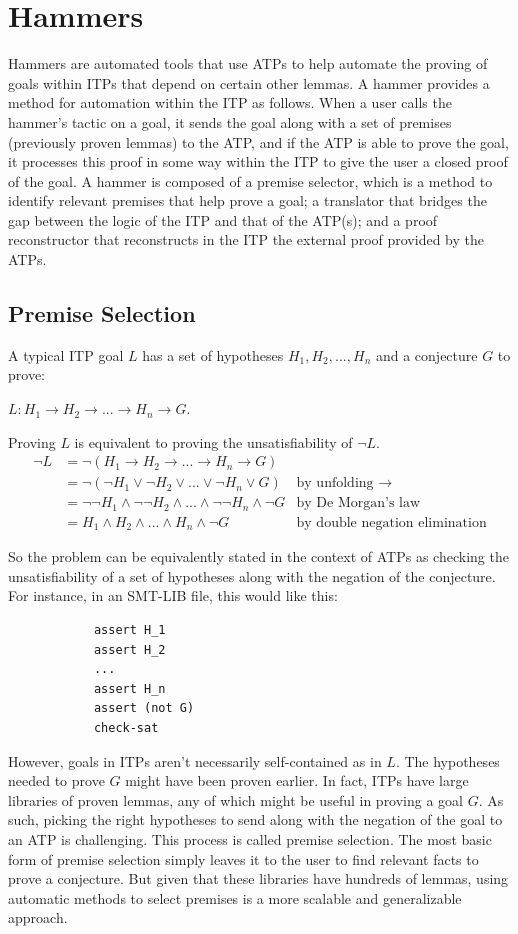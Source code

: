 \documentclass{article}
\begin{document}
\section{Hammers}
\label{sec:hammer}
	Hammers are automated tools that use ATPs to 
	help automate the proving of goals within ITPs
	that depend on certain other lemmas. A hammer 
	provides a method for automation within the 
	ITP as follows. When a user calls the hammer's 
	tactic on a goal, it sends the goal 
	along with a set of premises (previously proven 
	lemmas) to the ATP, and if the ATP is able to 
	prove the goal, it processes this proof in some 
	way within the ITP to give the user a closed 
	proof of the goal. A hammer is composed of 
	a premise selector, which is a method to identify 
	relevant premises that help prove a goal; a 
	translator that bridges the gap between the logic 
	of the ITP and that of the ATP(s); 
	and a proof reconstructor that reconstructs in the 
	ITP the external proof provided by the ATPs.
	
	\subsection{Premise Selection}
		A typical ITP goal $L$ has a set of hypotheses 
		$H_1, H_2, ..., H_n$ and a conjecture $G$ to 
		prove:
		\begin{center}
			$L : H_1 \to H_2 \to ... \to H_n \to G$.
		\end{center}
		Proving $L$ is equivalent to proving the unsatisfiability 
		of $\neg L$.
		\begin{align*}
			\neg L &= \neg (H_1 \to H_2 \to ... \to H_n \to G)\\
			&= \neg (\neg H_1 \lor \neg H_2 \lor ... \lor \neg H_n \lor G)
			& \text{by unfolding }\to \\
			&= \neg \neg H_1 \land \neg \neg H_2 \land ... \land \neg \neg H_n 
			\land \neg G
			& \text{by De Morgan's law}\\
			&= H_1 \land H_2 \land ... \land H_n \land \neg G
			& \text{by double negation elimination}
		\end{align*}
	
		So the problem can be equivalently stated in the context of ATPs
		as checking the unsatisfiability of a set of hypotheses 
		along with the negation of the conjecture. For instance, in an SMT-LIB file, this would like this:
		\begin{verbatim}
			assert H_1
			assert H_2
			...
			assert H_n
			assert (not G)
			check-sat
		\end{verbatim}
		However, goals in ITPs aren't necessarily 
		self-contained as in $L$. The hypotheses needed to 
		prove $G$ might have been proven earlier. In fact, 
		ITPs have large	libraries of proven lemmas, any of 
		which might be useful in proving a goal $G$. As 
		such, picking the right hypotheses to send 
		along with the negation of the goal to an ATP is challenging. This process is called premise 
		selection. The most basic form of premise selection 
		simply leaves it to the user to find relevant facts 
		to prove a conjecture. But given that these libraries 
		have hundreds of lemmas, using automatic methods 
		to select premises is a more scalable and 
		generalizable approach.
	
\end{document}
